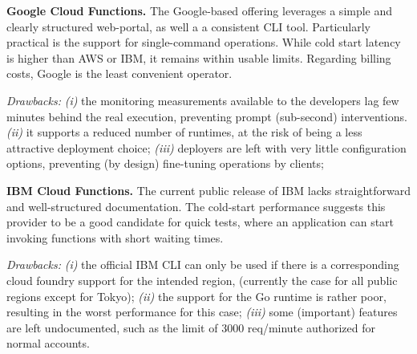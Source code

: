 \textbf{Google Cloud Functions.} The Google-based offering leverages a simple and clearly structured web-portal, as well a a consistent \gls{CLI} tool. 
Particularly practical is the support for single-command operations. 
While cold start latency is higher than AWS or IBM, it remains within usable limits. 
Regarding billing costs, Google is the least convenient operator.

\emph{Drawbacks:}
\emph{(i)} the monitoring measurements available to the developers lag few minutes behind the real execution, preventing prompt (\eg sub-second) interventions.
\emph{(ii)} it supports a reduced number of runtimes, at the risk of being a less attractive deployment choice;
\emph{(iii)} deployers are left with very little configuration options, preventing (by design) fine-tuning operations by clients;

\textbf{IBM Cloud Functions.}
The current public release of IBM lacks straightforward and well-structured documentation.
The cold-start performance suggests this provider to be a good candidate for quick tests, where an application can start invoking functions with short waiting times.

\emph{Drawbacks:}
\emph{(i)} the official IBM \gls{CLI} can only be used if there is a corresponding cloud foundry support for the intended region, (currently the case for all public regions except for Tokyo);
\emph{(ii)} the support for the Go runtime is rather poor, resulting in the worst performance for this case;
\emph{(iii)} some (important) features are left undocumented, such as the limit of 3000 req/minute authorized for normal accounts.
 

